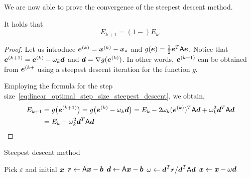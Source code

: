 We are now able to prove the convergence of the steepest descent method.
\begin{theorem}
    It holds that
    \[
        E_{k+1}  = \left( 1 - \right) E_k.
    \]
\end{theorem}
\begin{proof}
    Let us introduce $\mathbf{\boldsymbol{e}}^{(k)} = \mathbf{\boldsymbol{x}}^{(k)} - \mathbf{\boldsymbol{x}}_*$ and $g(\mathbf{\boldsymbol{e}}) = \frac{1}{2} \mathbf{\boldsymbol{e}}^T \mathsf A \mathbf{\boldsymbol{e}}$.
    Notice that $\mathbf{\boldsymbol{e}}^{(k+1)} = \mathbf{\boldsymbol{e}}^{(k)} - \omega_k \mathbf{\boldsymbol{d}}$ and $\mathbf{\boldsymbol{d}} = \nabla g(\mathbf{\boldsymbol{e}}^{(k)})$.
    In other words, $\mathbf{\boldsymbol{e}}^{(k+1)}$ can be obtained from $\mathbf{\boldsymbol{e}}^{(k+}$ using a steepest descent iteration for the function $g$.

    Employing the formula for the step size~\eqref{eq:linear_optimal_step_size_steepest_descent},
    we obtain,
    \begin{align*}
        E_{k+1} 
        &= g\bigl( \mathbf{\boldsymbol{e}}^{(k+1)} \bigr) 
        = g\bigl( \mathbf{\boldsymbol{e}}^{(k)} - \omega_k \mathbf{\boldsymbol{d}} \bigr) 
        = E_k - 2 \omega_k (\mathbf{\boldsymbol{e}}^{(k)})^T \mathsf A \mathbf{\boldsymbol{d}} + \omega_k^2 \mathbf{\boldsymbol{d}}^T \mathsf A \mathbf{\boldsymbol{d}} \\
        &=  E_k - \omega_k^2 \mathbf{\boldsymbol{d}}^T \mathsf A \mathbf{\boldsymbol{d}} \\
    \end{align*}
\end{proof}

\begin{algorithm}
\caption{Steepest descent method}%
\label{algo:steepest_descent_method}%
\begin{algorithmic}[1]
\State Pick $\varepsilon$ and initial $\mathbf{\boldsymbol{x}}$%
\State $\mathbf{\boldsymbol{r}} \gets \mathsf A \mathbf{\boldsymbol{x}} - \mathbf{\boldsymbol{b}}$%
    \State $\mathbf{\boldsymbol{d}} \gets \mathsf A \mathbf{\boldsymbol{x}} - \mathbf{\boldsymbol{b}}$
    \State $\omega \gets \mathbf{\boldsymbol{d}}^T \mathbf{\boldsymbol{r}}/\mathbf{\boldsymbol{d}}^T \mathsf A \mathbf{\boldsymbol{d}}$
    \State $\mathbf{\boldsymbol{x}} \gets \mathbf{\boldsymbol{x}} - \omega \mathbf{\boldsymbol{d}}$
\EndWhile
\end{algorithmic}
\end{algorithm}


